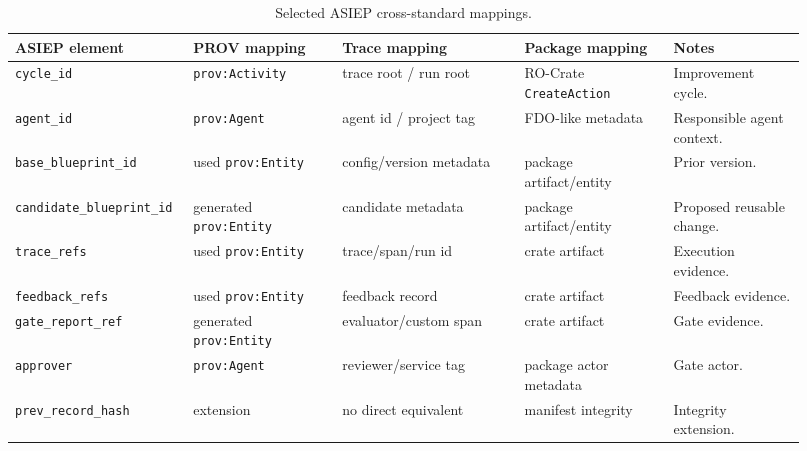 \begin{table}[t]
\centering
\caption{Selected ASIEP cross-standard mappings.}
\begin{tabular}{p{0.18\linewidth}p{0.18\linewidth}p{0.22\linewidth}p{0.18\linewidth}p{0.16\linewidth}}
\toprule
ASIEP element & PROV mapping & Trace mapping & Package mapping & Notes \\
\midrule
\texttt{cycle\_id} & \texttt{prov:Activity} & trace root / run root & RO-Crate \texttt{CreateAction} & Improvement cycle. \\
\texttt{agent\_id} & \texttt{prov:Agent} & agent id / project tag & FDO-like metadata & Responsible agent context. \\
\texttt{base\_blueprint\_id} & used \texttt{prov:Entity} & config/version metadata & package artifact/entity & Prior version. \\
\texttt{candidate\_blueprint\_id} & generated \texttt{prov:Entity} & candidate metadata & package artifact/entity & Proposed reusable change. \\
\texttt{trace\_refs} & used \texttt{prov:Entity} & trace/span/run id & crate artifact & Execution evidence. \\
\texttt{feedback\_refs} & used \texttt{prov:Entity} & feedback record & crate artifact & Feedback evidence. \\
\texttt{gate\_report\_ref} & generated \texttt{prov:Entity} & evaluator/custom span & crate artifact & Gate evidence. \\
\texttt{approver} & \texttt{prov:Agent} & reviewer/service tag & package actor metadata & Gate actor. \\
\texttt{prev\_record\_hash} & extension & no direct equivalent & manifest integrity & Integrity extension. \\
\bottomrule
\end{tabular}
\end{table}
